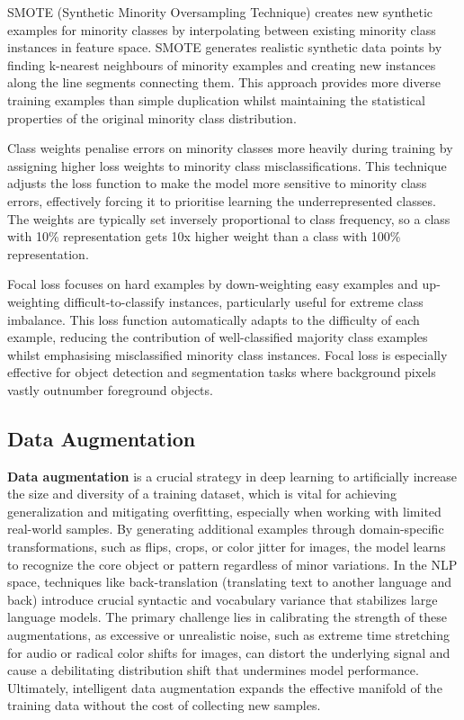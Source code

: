 SMOTE (Synthetic Minority Oversampling Technique) creates new synthetic examples for minority classes by interpolating between existing minority class instances in feature space. SMOTE generates realistic synthetic data points by finding k-nearest neighbours of minority examples and creating new instances along the line segments connecting them. This approach provides more diverse training examples than simple duplication whilst maintaining the statistical properties of the original minority class distribution.

Class weights penalise errors on minority classes more heavily during training by assigning higher loss weights to minority class misclassifications. This technique adjusts the loss function to make the model more sensitive to minority class errors, effectively forcing it to prioritise learning the underrepresented classes. The weights are typically set inversely proportional to class frequency, so a class with 10\% representation gets 10x higher weight than a class with 100\% representation.

Focal loss focuses on hard examples by down-weighting easy examples and up-weighting difficult-to-classify instances, particularly useful for extreme class imbalance. This loss function automatically adapts to the difficulty of each example, reducing the contribution of well-classified majority class examples whilst emphasising misclassified minority class instances. Focal loss is especially effective for object detection and segmentation tasks where background pixels vastly outnumber foreground objects.


\subsection{Data Augmentation}

\textbf{Data augmentation} is a crucial strategy in deep learning to artificially increase the size and diversity of a training dataset, which is vital for achieving generalization and mitigating overfitting, especially when working with limited real-world samples. By generating additional examples through domain-specific transformations, such as flips, crops, or color jitter for images, the model learns to recognize the core object or pattern regardless of minor variations. In the NLP space, techniques like back-translation (translating text to another language and back) introduce crucial syntactic and vocabulary variance that stabilizes large language models. The primary challenge lies in calibrating the strength of these augmentations, as excessive or unrealistic noise, such as extreme time stretching for audio or radical color shifts for images, can distort the underlying signal and cause a debilitating distribution shift that undermines model performance. Ultimately, intelligent data augmentation expands the effective manifold of the training data without the cost of collecting new samples.

